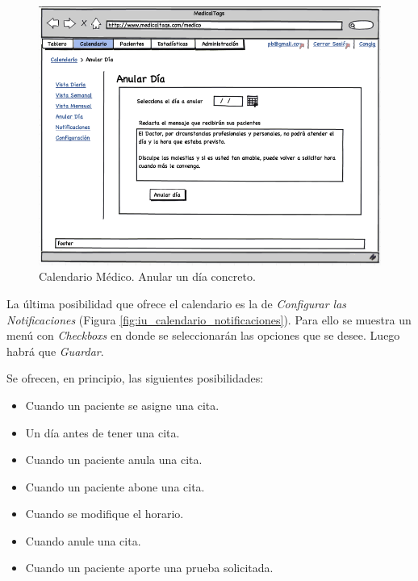 			\begin{figure}[H]
			  \centering
			    \includegraphics[width=12cm]{img/png/interfaz/14_Calendario_Medico_Anular.png}
			  \caption{Calendario Médico. Anular un día concreto.}
			  \label{fig:iu_calendario_anular_dia}
			\end{figure}
			
			La última posibilidad que ofrece el calendario es la de \textit{Configurar las Notificaciones} (Figura \ref{fig:iu_calendario_notificaciones}). Para ello se muestra un menú con \textit{Checkboxs} en donde se seleccionarán las opciones que se desee. Luego habrá que \textit{Guardar}. 
			
			Se ofrecen, en principio, las siguientes posibilidades:
			\begin{itemize}
				\item Cuando un paciente se asigne una cita.
				\item Un día antes de tener una cita.
				\item Cuando un paciente anula una cita.
				\item Cuando un paciente abone una cita.
				\item Cuando se modifique el horario.
				\item Cuando anule una cita.
				\item Cuando un paciente aporte una prueba solicitada.
			\end{itemize}
			
